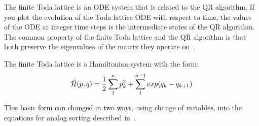 The finite Toda lattice is an ODE system that is related to the QR algorithm.
If you plot the evolution of the Toda lattice ODE with respect to time, the values of the ODE at integer time steps is the intermediate states of the QR algorithm.
The common property of the finite Toda lattice and the QR algorithm is that both preserve the eigenvalues of the matrix they operate on~\cite{bloch}.

The finite Toda lattice is a Hamiltonian system with the form:
\[ \hat{\mathcal{H}}(p,q) = \frac{1}{2} \sum^{n}_{1}p_k^2 + \sum^{n-1}_{1}exp(q_k-q_{k+1})\]

This basic form can changed in two ways, using change of variables, into the equations for analog sorting described in~\cite{brockett}.




